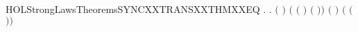 \newcommand{\HOLStrongLawsTheoremsSYNCXXTRANSXXTHM}{\UseVerbatim{HOLStrongLawsTheoremsSYNCXXTRANSXXTHM}}
\begin{SaveVerbatim}{HOLStrongLawsTheoremsSYNCXXTRANSXXTHMXXEQ}
\HOLTokenTurnstile{} \HOLSymConst{\HOLTokenForall{}}     .
            \HOLTokenTransBegin{}\HOLTokenTransEnd {} \HOLSymConst{\HOLTokenEquiv{}}
       \HOLSymConst{\HOLTokenExists{}} .
            \HOLSymConst{\HOLTokenLeq{}}  \HOLSymConst{\HOLTokenConj{}} \ensuremath{(} \HOLSymConst{\ensuremath{=}}  \ensuremath{)} \HOLSymConst{\HOLTokenConj{}}
           \ensuremath{(} \ensuremath{(} \ensuremath{)} \HOLSymConst{\ensuremath{=}}  \ensuremath{(} \ensuremath{)}\ensuremath{)} \HOLSymConst{\HOLTokenConj{}} \ensuremath{(} \HOLSymConst{\ensuremath{=}} \HOLConst{\ensuremath{\tau}}\ensuremath{)} \HOLSymConst{\HOLTokenConj{}}
           \ensuremath{(} \HOLSymConst{\ensuremath{=}}  \HOLSymConst{\ensuremath{\mid}}  \ensuremath{(} \ensuremath{)}\ensuremath{)}
\end{SaveVerbatim}
\newcommand{\HOLStrongLawsTheoremsSYNCXXTRANSXXTHMXXEQ}{\UseVerbatim{HOLStrongLawsTheoremsSYNCXXTRANSXXTHMXXEQ}}
